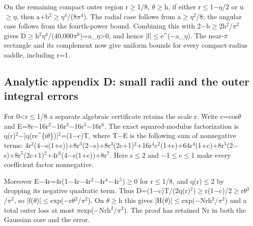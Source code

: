 \documentclass[11pt,a4paper]{article}
\begin{document}
On the remaining compact outer region r\ensuremath{\geq}1/8, \ensuremath{\theta}\ensuremath{\geq}h, if either r\ensuremath{\leq}1\ensuremath{-}\ensuremath{\eta}/2 or u\ensuremath{\geq}\ensuremath{\eta}, then a+b\ensuremath{^2}\ensuremath{\geq}\ensuremath{\eta}\ensuremath{^4}/(8\ensuremath{\pi}\ensuremath{^4}). The radial case follows from a\ensuremath{\geq}\ensuremath{\eta}\ensuremath{^2}/8; the angular case follows from the fourth-power bound. Combining this with 2\ensuremath{-}b\ensuremath{\geq}2h\ensuremath{^2}/\ensuremath{\pi}\ensuremath{^2} gives D\ensuremath{\geq}h\ensuremath{^2}\ensuremath{\eta}\ensuremath{^4}/(40,000\ensuremath{\pi}\ensuremath{^6})=a\_\ensuremath{\eta}>0, and hence |f|\ensuremath{\leq}e\textasciicircum{}(\ensuremath{-}a\_\ensuremath{\eta}). The near-\ensuremath{\pi} rectangle and its complement now give uniform bounds for every compact-radius saddle, including r=1.

\subsection{Analytic appendix D: small radii and the outer integral errors}
For 0<r\ensuremath{\leq}1/8 a separate algebraic certificate retains the scale r. Write c=cos\ensuremath{\theta} and E=8r\ensuremath{-}16r\ensuremath{^2}\ensuremath{-}16r\ensuremath{^3}\ensuremath{-}16r\ensuremath{^5}\ensuremath{-}16r\ensuremath{^6}. The exact squared-modulus factorization is q(r)\ensuremath{^2}\ensuremath{-}|q(re\textasciicircum{}\{i\ensuremath{\theta}\})|\ensuremath{^2}=(1\ensuremath{-}c)T, where T\ensuremath{-}E is the following sum of nonnegative terms: 4r\ensuremath{^2}(4\ensuremath{-}s(1+c))+8r\ensuremath{^3}(2\ensuremath{-}s)+8r\ensuremath{^3}(2c+1)\ensuremath{^2}+16r\ensuremath{^4}c\ensuremath{^2}(1+c)+64r\ensuremath{^4}(1+c)+8r\ensuremath{^5}(2\ensuremath{-}s)+8r\ensuremath{^5}(2c+1)\ensuremath{^2}+4r\ensuremath{^6}(4\ensuremath{-}s(1+c))+8r\ensuremath{^7}. Here s\ensuremath{\leq}2 and \ensuremath{-}1\ensuremath{\leq}c\ensuremath{\leq}1 make every coefficient factor nonnegative.

Moreover E\ensuremath{-}4r=4r(1\ensuremath{-}4r\ensuremath{-}4r\ensuremath{^2}\ensuremath{-}4r\ensuremath{^4}\ensuremath{-}4r\ensuremath{^5})\ensuremath{\geq}0 for r\ensuremath{\leq}1/8, and q(r)\ensuremath{\leq}2 by dropping its negative quadratic term. Thus D=(1\ensuremath{-}c)T/(2q(r)\ensuremath{^2})\ensuremath{\geq}r(1\ensuremath{-}c)/2\ensuremath{\geq}r\ensuremath{\theta}\ensuremath{^2}/\ensuremath{\pi}\ensuremath{^2}, so |f(\ensuremath{\theta})|\ensuremath{\leq}exp(\ensuremath{-}r\ensuremath{\theta}\ensuremath{^2}/\ensuremath{\pi}\ensuremath{^2}). On \ensuremath{\theta}\ensuremath{\geq}h this gives |H(\ensuremath{\theta})|\ensuremath{\leq}exp(\ensuremath{-}Nrh\ensuremath{^2}/\ensuremath{\pi}\ensuremath{^2}) and a total outer loss at most \ensuremath{\pi}exp(\ensuremath{-}Nrh\ensuremath{^2}/\ensuremath{\pi}\ensuremath{^2}). The proof has retained Nr in both the Gaussian core and the error.
\end{document}
